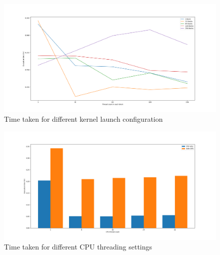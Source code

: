 \documentclass{PHlab-thesis}
\begin{document}
\begin{figure}
	\centering
	\includegraphics[scale=0.3]{figures/gpu_config.png}
	\caption{Time taken for different kernel launch configuration}
	\label{fig:gpuconfig} 
\end{figure}
\begin{figure}
	\centering
	\includegraphics[scale=0.3]{figures/multithread.png}
	\caption{Time taken for different CPU threading settings}
	\label{fig:multithread} 
\end{figure}
\end{document}
